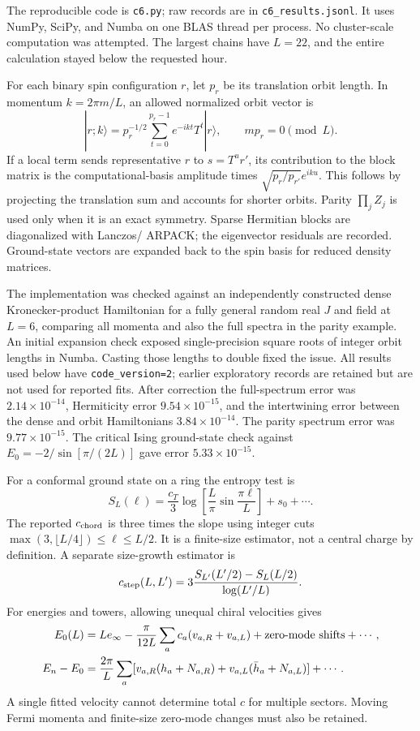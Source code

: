 \documentclass[11pt]{article}
\begin{document}
The reproducible code is \texttt{c6.py}; raw records are in
\texttt{c6\_results.jsonl}. It uses NumPy, SciPy, and Numba on one BLAS thread
per process. No cluster-scale computation was attempted. The largest chains
have $L=22$, and the entire calculation stayed below the requested hour.

For each binary spin configuration $r$, let $p_r$ be its translation orbit
length. In momentum $k=2\pi m/L$, an allowed normalized orbit vector is
\begin{equation}
 |r;k\rangle=p_r^{-1/2}\sum_{t=0}^{p_r-1}e^{-ikt}T^t|r\rangle,
 \qquad mp_r=0\pmod L.
\end{equation}
If a local term sends representative $r$ to $s=T^u r'$, its contribution to
the block matrix is the computational-basis amplitude times
$\sqrt{p_r/p_{r'}}e^{iku}$. This follows by projecting the translation sum
and accounts for shorter orbits. Parity $\prod_jZ_j$ is used only when it is
an exact symmetry. Sparse Hermitian blocks are diagonalized with Lanczos/
ARPACK; the eigenvector residuals are recorded. Ground-state vectors are
expanded back to the spin basis for reduced density matrices.

The implementation was checked against an independently constructed dense
Kronecker-product Hamiltonian for a fully general random real $J$ and field
at $L=6$, comparing all momenta and also the full spectra in the parity
example. An initial expansion check exposed single-precision square roots
of integer orbit lengths in Numba. Casting those lengths to double fixed
the issue. All results used below have \texttt{code\_version=2}; earlier
exploratory records are retained but are not used for reported fits.
After correction the full-spectrum error was $2.14\times10^{-14}$,
Hermiticity error $9.54\times10^{-15}$, and the intertwining error between
the dense and orbit Hamiltonians $3.84\times10^{-14}$. The parity spectrum
error was $9.77\times10^{-15}$. The critical Ising ground-state check against
$E_0=-2/\sin[\pi/(2L)]$ gave error $5.33\times10^{-15}$.

For a conformal ground state on a ring the entropy test is
\begin{equation}
 S_L(\ell)=\frac{c_T}{3}\log\left[\frac L\pi
 \sin\frac{\pi\ell}L\right]+s_0+\cdots.
\end{equation}
The reported $c_{\rm chord}$ is three times the slope using integer cuts
$\max(3,\lfloor L/4\rfloor)\le\ell\le L/2$. It is a finite-size estimator,
not a central charge by definition. A separate size-growth estimator is
\begin{equation}
 c_{\rm step}(L,L')=
 3\frac{S_{L'}(L'/2)-S_L(L/2)}{\log(L'/L)}.
\end{equation}
For energies and towers, allowing unequal chiral velocities gives
\begin{align}
 E_0(L)&=Le_\infty-\frac{\pi}{12L}
 \sum_a c_a(v_{a,R}+v_{a,L})+\hbox{zero-mode shifts}+\cdots,\\
 E_n-E_0&=\frac{2\pi}L\sum_a
 [v_{a,R}(h_a+N_{a,R})+v_{a,L}(\bar h_a+N_{a,L})]+\cdots.
\end{align}
A single fitted velocity cannot determine total $c$ for multiple sectors.
Moving Fermi momenta and finite-size zero-mode changes must also be retained.
\end{document}
